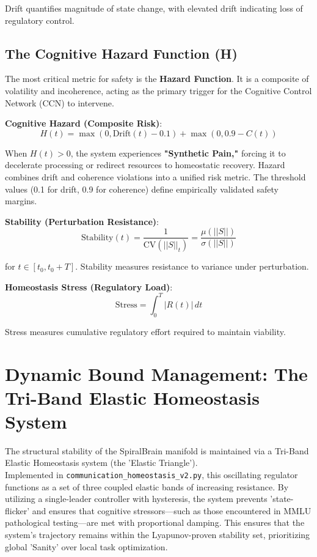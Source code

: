 \documentclass[12pt,a4paper]{report}
\begin{document}
Drift quantifies magnitude of state change, with elevated drift indicating loss of regulatory control.

\subsection{The Cognitive Hazard Function (H)}

The most critical metric for safety is the \textbf{Hazard Function}. It is a composite of volatility and incoherence, acting as the primary trigger for the Cognitive Control Network (CCN) to intervene.

\textbf{Cognitive Hazard (Composite Risk)}:
\[H(t) = \max(0, \text{Drift}(t) - 0.1) + \max(0, 0.9 - C(t))\]

When \textbf{$H(t) > 0$}, the system experiences \textbf{"Synthetic Pain,"} forcing it to decelerate processing or redirect resources to homeostatic recovery. Hazard combines drift and coherence violations into a unified risk metric. The threshold values (0.1 for drift, 0.9 for coherence) define empirically validated safety margins.

\textbf{Stability (Perturbation Resistance)}:
\[\text{Stability}(t) = \frac{1}{\text{CV}(||S||_t)} = \frac{\mu(||S||)}{\sigma(||S||)}\]

for $t \in [t_0, t_0 + T]$. Stability measures resistance to variance under perturbation.

\textbf{Homeostasis Stress (Regulatory Load)}:
\[\text{Stress} = \int_0^T |R(t)| \, dt\]

Stress measures cumulative regulatory effort required to maintain viability.

\section{Dynamic Bound Management: The Tri-Band Elastic Homeostasis System}

The structural stability of the SpiralBrain manifold is maintained via a Tri-Band Elastic Homeostasis system (the 'Elastic Triangle'). \\ Implemented in  \texttt{communication\_homeostasis\_v2.py}, this oscillating regulator functions as a set of three coupled elastic bands of increasing resistance. By utilizing a single-leader controller with hysteresis, the system prevents 'state-flicker' and ensures that cognitive stressors—such as those encountered in MMLU pathological testing—are met with proportional damping. This ensures that the system's trajectory remains within the Lyapunov-proven stability set, prioritizing global 'Sanity' over local task optimization.
\end{document}
